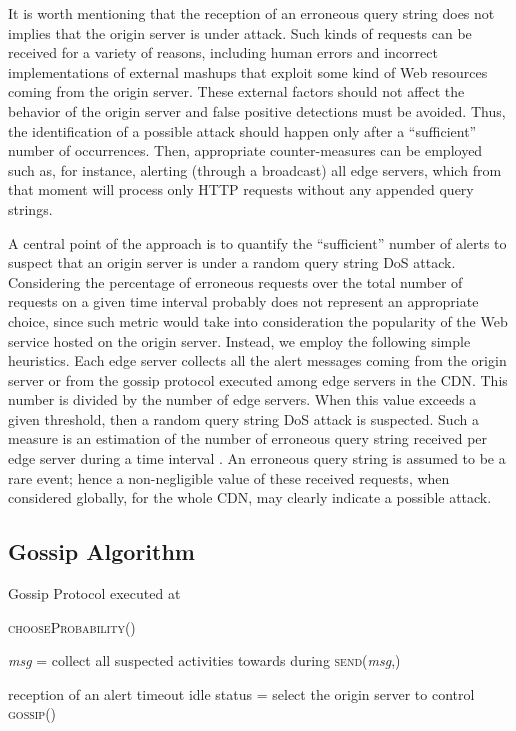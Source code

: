 \documentclass{IEEEtran}
\begin{document}
It is worth mentioning that the reception of an erroneous query string does not implies that the origin server is under attack. Such kinds of requests can be received for a variety of reasons, including human errors and incorrect implementations of external mashups that exploit some kind of Web resources coming from the origin server. These external factors should not affect the behavior of the origin server and false positive detections must be avoided. Thus, the identification of a possible attack should happen only after a ``sufficient'' number of occurrences. Then, appropriate counter-measures can be employed such as, for instance, alerting (through a broadcast) all edge servers, which from that moment will process only HTTP requests without any appended query strings.

A central point of the approach is to quantify the ``sufficient'' number of alerts to suspect that an origin server is under a random query string DoS attack. Considering the percentage of erroneous requests over the total number of requests on a given time interval probably does not represent an appropriate choice, since such metric would take into consideration the popularity of the Web service hosted on the origin server.
Instead, we employ the following simple heuristics. Each edge server collects all the alert messages coming from the origin server or from the gossip protocol executed among edge servers in the CDN. This number is divided by the number  of edge servers. When this value exceeds a given threshold, then a random query string DoS attack is suspected. Such a measure is an estimation of the number of erroneous query string received per edge server during a time interval . An erroneous query string is assumed to be a rare event; hence a non-negligible value of these received requests, when considered globally, for the whole CDN, may clearly indicate a possible attack.

\subsection{Gossip Algorithm}

\begin{algorithm}[t]
\caption{Gossip Protocol executed at } \label{alg:simple}
\begin{algorithmic}
\STATE  \textsc{chooseProbability()} \STATE

\STATE \emph{msg} = collect all suspected activities towards  during \FORALL{}   \STATE \textsc{send}(\emph{msg},)\ENDIF \ENDFOR
\STATE

 reception of an alert \OR timeout idle status
\STATE  = select the origin server to control
\STATE \textsc{gossip}()
\end{algorithmic}
\end{algorithm}
\end{document}
